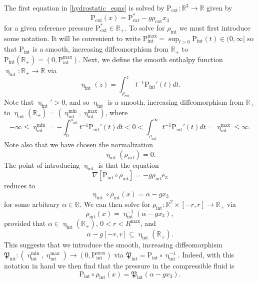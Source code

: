 \documentclass[11pt,reqno]{amsart}
\numberwithin{equation}{section}
\def\nab{\nabla}
\def\nab{\nabla}
\newcommand{\m}{\mathrm}
\def\pint{\m{P}_{\m{int}}}
\def\pfint{\mathfrak{P}_{\m{int}}}
\def\hint{\upeta_{\m{int}}}
\def\pext{\m{P}_{\m{ext}}}
\def\R{\mathbb{R}}
\begin{document}
The first equation in \eqref{hydrostatic_eqns} is solved by $\pext : \R^3 \to \R$ given by 
\begin{equation}\label{pext_def}
 \pext(x) = \pext^\ast - g \rho_{\m{ext}} x_3 
\end{equation}
for a given reference pressure $\pext^\ast \in \R_+$.  To solve for $\rho_{\m{int}}$ we must first introduce some notation.  It will be convenient to write $\pint^{\m{max}} = \sup_{t > 0} \pint(t) \in (0, \infty] $ so that $\pint$ is a smooth, increasing diffeomorphism from $\R_+$ to $\pint(\R_+) = (0,\pint^{\m{max}})$.  Next, we define the smooth enthalpy function $\hint : \R_+ \to\R$ via 
\begin{equation}
 \hint(z) =  \int_{\rho_{\m{ext}}}^z t^{-1} \pint'(t) dt.
\end{equation}
Note that $\hint' >0$, and so $\hint$ is a smooth, increasing diffeomorphism from $\R_+$ to  $\hint(\R_+)  = (\hint^{\m{\min}}, \hint^{\m{max}})$, where 
\begin{equation}
-\infty \le  \hint^{\m{min}} = - \int_{0}^{\rho_{\m{ext}}} t^{-1} \pint'(t) dt <0  < \int_{\rho_{\m{ext}}}^\infty t^{-1} \pint'(t) dt  =\hint^{\m{max}} \le \infty. 
\end{equation}
Note also that we have chosen the normalization 
\begin{equation}\label{enthalpy_normalization}
\hint(\rho_{\m{ext}}) = 0. 
\end{equation}
The point of introducing $\hint$ is that the equation 
\begin{equation}
 \nab[\pint\circ \rho_{\m{int}}] = - g \rho_{\m{int}} e_3
\end{equation}
reduces to 
\begin{equation}
  \hint \circ \rho_{\m{int}}(x)  =\alpha -gx_3
\end{equation}
for some arbitrary $\alpha \in \R$.  We can then solve for $\rho_{\m{int}} : \R^2 \times [-r,r] \to \R_+$ via 
\begin{equation}\label{rhoint_def}
 \rho_{\m{int}}(x) = \hint^{-1}(\alpha - g x_3),
\end{equation}
provided that  $\alpha \in \hint(\R_+)$, $0 < r < R^{\m{max}}$, and 
\begin{equation}\label{rhoint_def_compat}
 \alpha - g [-r,r] \subseteq \hint(\R_+).
\end{equation}
This suggests that we introduce  the smooth, increasing diffeomorphism $\pfint : (\hint^{\m{min}}, \hint^{\m{max}}) \to (0,\pint^{\m{max}})$ via $\pfint = \pint \circ \hint^{-1}$.  Indeed, with this notation in hand we then find that the pressure in the compressible fluid is 
\begin{equation}\label{pint_pfint_def}
 \pint \circ \rho_{\m{int}}(x) = \pfint(\alpha -gx_3).
\end{equation}
\end{document}
